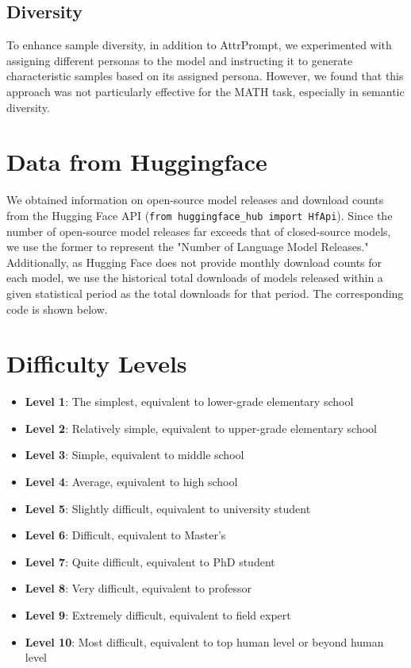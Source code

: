 \subsection{Diversity}
To enhance sample diversity, in addition to AttrPrompt, we experimented with assigning different personas \citep{persona} to the model and instructing it to generate characteristic samples based on its assigned persona. However, we found that this approach was not particularly effective for the MATH task, especially in semantic diversity.


\section{Data from Huggingface}
\label{sec:huggingface}
We obtained information on open-source model releases and download counts from the Hugging Face API (\texttt{from huggingface\_hub import HfApi}). Since the number of open-source model releases far exceeds that of closed-source models, we use the former to represent the "Number of Language Model Releases." Additionally, as Hugging Face does not provide monthly download counts for each model, we use the historical total downloads of models released within a given statistical period as the total downloads for that period. The corresponding code is shown below.


\section{Difficulty Levels}
\label{sec:dif_level}
\begin{itemize}
    \item \textbf{Level 1}: The simplest, equivalent to lower-grade elementary school
\item \textbf{Level 2}: Relatively simple, equivalent to upper-grade elementary school
\item \textbf{Level 3}: Simple, equivalent to middle school
\item \textbf{Level 4}: Average, equivalent to high school
\item \textbf{Level 5}: Slightly difficult, equivalent to university student
\item \textbf{Level 6}: Difficult, equivalent to Master's
\item \textbf{Level 7}: Quite difficult, equivalent to PhD student
\item \textbf{Level 8}: Very difficult, equivalent to professor
\item \textbf{Level 9}: Extremely difficult, equivalent to field expert
\item \textbf{Level 10}: Most difficult, equivalent to top human level or beyond human level
\end{itemize}


